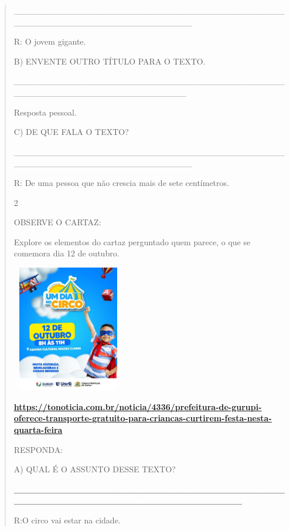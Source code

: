 {{{{\begin{verse}
{{\begin{escolha}
{{{{\_\_\_\_\_\_\_\_\_\_\_\_\_\_\_\_\_\_\_\_\_\_\_\_\_\_\_\_\_\_\_\_\_\_\_\_\_\_\_\_\_\_\_\_\_\_\_\_\_\_\_\_\_\_\_\_\_\_\_\_\_\_\_\_\_\_\_\_\_\_\_\_\_

R: O jovem gigante.

B) ENVENTE OUTRO TÍTULO PARA O TEXTO.

\_\_\_\_\_\_\_\_\_\_\_\_\_\_\_\_\_\_\_\_\_\_\_\_\_\_\_\_\_\_\_\_\_\_\_\_\_\_\_\_\_\_\_\_\_\_\_\_\_\_\_\_\_\_\_\_\_\_\_\_\_\_\_\_\_\_\_\_\_\_\_\_

Resposta pessoal.

C) DE QUE FALA O TEXTO?

\_\_\_\_\_\_\_\_\_\_\_\_\_\_\_\_\_\_\_\_\_\_\_\_\_\_\_\_\_\_\_\_\_\_\_\_\_\_\_\_\_\_\_\_\_\_\_\_\_\_\_\_\_\_\_\_\_\_\_\_\_\_\_\_\_\_\_\_\_\_\_\_\_

R: De uma pessoa que não crescia mais de sete centímetros.

\num{2}

OBSERVE O CARTAZ:

Explore os elementos do cartaz perguntado quem parece, o que se comemora
dia 12 de outubro.

\includegraphics[width=1.92500in,height=2.18056in]{media/image119.jpeg}

\protect\hypertarget{_heading=h.t2raxp5v2ex8}{}{}

\href{https://tonoticia.com.br/noticia/4336/prefeitura-de-gurupi-oferece-transporte-gratuito-para-criancas-curtirem-festa-nesta-quarta-feira}{\textbf{https://tonoticia.com.br/noticia/4336/prefeitura-de-gurupi-oferece-transporte-gratuito-para-criancas-curtirem-festa-nesta-quarta-feira}}

RESPONDA:

A) QUAL É O ASSUNTO DESSE TEXTO?

\textbf{\_\_\_\_\_\_\_\_\_\_\_\_\_\_\_\_\_\_\_\_\_\_\_\_\_\_\_\_\_\_\_\_\_\_\_\_\_\_\_\_\_\_\_\_\_\_\_\_\_\_\_\_\_\_\_\_\_\_\_\_\_\_\_\_\_\_\_\_\_\_}

R:O circo vai estar na cidade.

}}}}
\end{escolha}}}
\end{verse}}}}}

